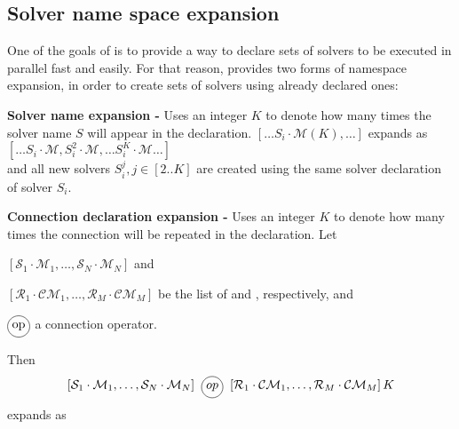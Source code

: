 %

\subsection{Solver name space expansion}

One of the goals of \posl{} is to provide a way to declare sets of solvers to be executed in parallel fast and easily. For that reason, \posl{} provides two forms of namespace expansion, in order to create sets of solvers using already declared ones:

\textbf{Solver name expansion - } Uses an integer $K$ to denote how many times the solver name $S$ will appear in the declaration. $\left[\dots S_i\cdot\mathcal{M}(K),\dots\right]$ expands as $\left[\dots S_i\cdot\mathcal{M}, S_i^2\cdot\mathcal{M},\dots S_i^K\cdot\mathcal{M}\dots\right]$\\
and all new solvers $S_i^j, j\in [2..K]$ are created using the same solver declaration of solver $S_i$.

\textbf{Connection declaration expansion - } Uses an integer $K$ to denote how many times the connection will be repeated in the declaration. Let 
\begin{inparaenum}[a)]
\item $\left[\mathcal{S}_1\cdot\mathcal{M}_1,\dots,\mathcal{S}_{N}\cdot\mathcal{M}_{N}\right]$ and 
\item $\left[\mathcal{R}_1\cdot\mathcal{CM}_1,\dots,\mathcal{R}_{M}\cdot\mathcal{CM}_{M}\right]$ be the list of \jacks{} and \outlets, respectively, and
\item $\circled{op}$ a connection operator.
\end{inparaenum} Then $$\left[\mathcal{S}_1\cdot\mathcal{M}_1,\dots,\mathcal{S}_{N}\cdot\mathcal{M}_{N}\right] \poslop{op} \left[\mathcal{R}_1\cdot\mathcal{CM}_1,\dots,\mathcal{R}_{M}\cdot\mathcal{CM}_{M}\right]K$$ expands as

